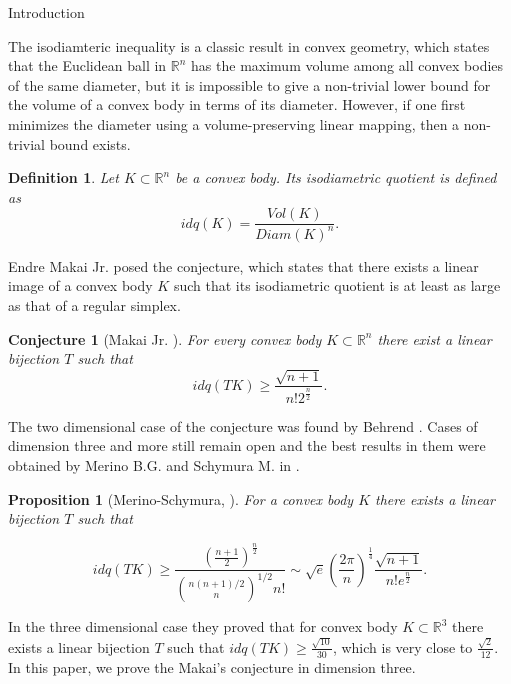 \documentclass[12pt]{article}
\newtheorem{proposition}{Proposition}[section]
\newtheorem{conj}{Conjecture}[section]
\newtheorem{definition}{Definition}[section]
\begin{document}
\begin{section}{Introduction}

    The isodiamteric inequality is a classic result in convex geometry, which states  that the Euclidean ball in $\mathbb{R}^n$ has the maximum volume among all convex bodies of the same diameter, but it is impossible to give a non-trivial lower bound for the volume of a convex body in terms of its diameter. However, if one first minimizes the diameter using a volume-preserving linear mapping, then a non-trivial bound exists. 

    \begin{definition}
        Let $K \subset \mathbb{R}^{n}$ be a convex body. Its isodiametric quotient is defined as 
        $$
            idq(K) = \frac{Vol(K)}{Diam(K)^n}.
        $$
    \end{definition}    

    Endre Makai Jr. \cite{makai1978} posed the conjecture, which states that there exists a linear image of a convex body $K$ such that its isodiametric quotient is at least as large as  that of a regular simplex.
    
    \begin{conj}[Makai Jr. \cite{makai1978}]
        For every convex body $K\subset \mathbb{R}^n$ there exist a linear bijection $T$ such that 
        $$
            idq(TK)\geq \frac{\sqrt{n+1}}{n! 2^{\frac{n}{2}}}.
        $$
    \end{conj}
    
    The two dimensional case of the conjecture was found by Behrend \cite{behrend}. Cases of dimension three and more still remain open and the best results in them were obtained by Merino B.G. and  Schymura M. in \cite{shimura}. 

    \begin{proposition}[Merino-Schymura, \cite{shimura}] For a convex body $K$ there exists a linear bijection $T$ such that

    $$
        idq(TK)\geq \frac{\left(\frac{n+1}{2}\right)^{\frac{n}{2}}}{\binom{n(n+1)/2}{n}^{1/2}n!} \sim \sqrt{e}\left(\frac{2\pi}{n}\right)^{\frac{1}{4}}\frac{\sqrt{n+1}}{n!e^{\frac{n}{2}}}.
    $$
        
    \end{proposition}

    In the three dimensional case they proved that for convex body $K\subset \mathbb{R}^3$ there exists a linear bijection $T$ such that $idq(TK)\geq \frac{\sqrt{10}}{30}$, which is very close to $\frac{\sqrt{2}}{12}$. In this paper, we prove the Makai's conjecture in dimension three. 


\end{section}
\end{document}
